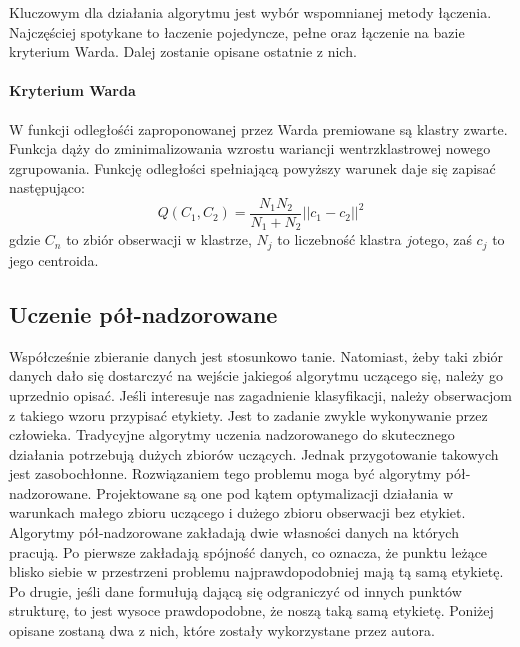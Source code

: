 \documentclass{article}
\begin{document}
Kluczowym dla działania algorytmu jest wybór wspomnianej metody łączenia.
Najczęściej spotykane to łaczenie pojedyncze, pełne oraz łączenie na bazie kryterium Warda. 
Dalej zostanie opisane ostatnie z nich.


\paragraph{Kryterium Warda}
W funkcji odległośći zaproponowanej przez Warda premiowane są klastry zwarte.
Funkcja dąży do zminimalizowania wzrostu wariancji wentrzklastrowej nowego zgrupowania.
Funkcję odległości spełniającą powyższy warunek daje się zapisać następująco:
\[ Q(C_1, C_2) = \frac{N_1N_2}{N_1 + N_2}||c_1 - c_2||^2 \]
gdzie $C_n$ to zbiór obserwacji w klastrze, $N_j$ to liczebność klastra $j$otego, zaś $c_j$ to jego centroida.

\subsection{Uczenie pół-nadzorowane}
Współcześnie zbieranie danych jest stosunkowo tanie.
Natomiast, żeby taki zbiór danych dało się dostarczyć na wejście jakiegoś algorytmu uczącego się, należy go uprzednio opisać.
Jeśli interesuje nas zagadnienie klasyfikacji, należy obserwacjom z takiego wzoru przypisać etykiety.
Jest to zadanie zwykle wykonywanie przez człowieka.
Tradycyjne algorytmy uczenia nadzorowanego do skutecznego działania potrzebują dużych zbiorów uczących. 
Jednak przygotowanie takowych jest zasobochłonne.
Rozwiązaniem tego problemu moga być algorytmy pół-nadzorowane.
Projektowane są one pod kątem optymalizacji działania w warunkach małego zbioru uczącego i dużego zbioru obserwacji bez etykiet.
Algorytmy pół-nadzorowane zakładają dwie własności danych na których pracują.
Po pierwsze zakładają spójność danych, co oznacza, że punktu leżące blisko siebie w przestrzeni problemu najprawdopodobniej mają tą samą etykietę.
Po drugie, jeśli dane formułują dającą się odgraniczyć od innych punktów strukturę, to jest wysoce prawdopodobne, że noszą taką samą etykietę\cite{Zhou2004}.
Poniżej opisane zostaną dwa z nich, które zostały wykorzystane przez autora.
\end{document}
